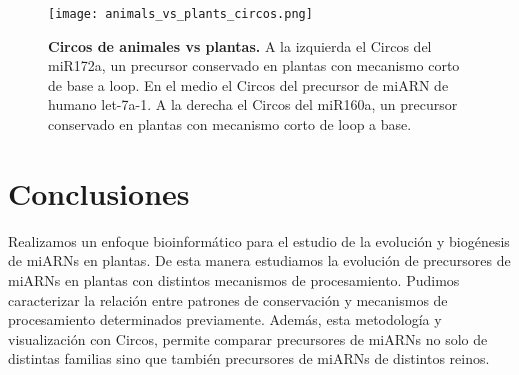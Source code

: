 \begin{landscape}                                                                      
\begin{figure}[htbp!] 
        \centering    
        \texttt{[image: animals\_vs\_plants\_circos.png]}
        \caption[Circos de animales vs plantas]{
        \textbf{Circos de animales vs plantas.}
		A la izquierda el Circos del miR172a, un precursor conservado en plantas con mecanismo corto de base a loop.
		En el medio el Circos del precursor de miARN de humano let-7a-1.
		A la derecha el Circos del miR160a, un precursor conservado en plantas con mecanismo corto de loop a base.
        }
	 \label{fig:animals_vs_plants_circos}
    \end{figure}
\end{landscape}


\section{Conclusiones}

Realizamos un enfoque bioinformático para el estudio de la evolución y biogénesis de miARNs en plantas.
De esta manera estudiamos la evolución de precursores de miARNs en plantas con distintos mecanismos de procesamiento.
Pudimos caracterizar la relación entre patrones de conservación y mecanismos de procesamiento determinados previamente. 
Además, esta metodología y visualización con Circos, permite comparar precursores de miARNs no solo de distintas familias sino que también precursores de miARNs de distintos reinos.
